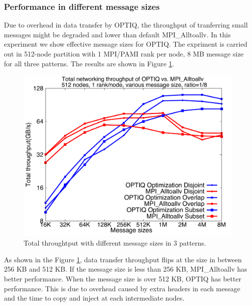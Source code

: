 \subsubsection{Performance in different message sizes}

Due to overhead in data transfer by OPTIQ, the throughput of tranferring small messages might be degraded and lower than default MPI\_Alltoallv. In this experiment we show effective message sizes for OPTIQ. The expriment is carried out in 512-node partition with 1 MPI/PAMI rank per node, 8 MB message size for all three patterns. The results are shown in Figure \ref{fig:messagesize}.

\begin{figure}[!htb]
\vspace{-0.15in}
\centering
\includegraphics[scale=0.27]{figures/messagesize.pdf}
\vspace{-0.15in}
\caption{Total throughtput with different message sizes in 3 patterns.}
\vspace{-0.15in}
\label{fig:messagesize}
\end{figure}

As shown in the Figure \ref{fig:messagesize}, data transfer throughput flips at the size in between 256 KB and 512 KB. If the message size is less than 256 KB, MPI\_Alltoallv has better performance. When the message size is over 512 KB, OPTIQ has better performance. This is due to overhead caused by extra headers in each message and the time to copy and inject at each intermediate nodes.
